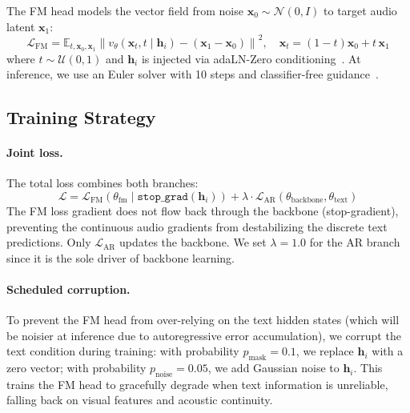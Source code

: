\documentclass{article}
\begin{document}
The FM head models the vector field from noise $\mathbf{x}_0 \sim \mathcal{N}(0, I)$ to target audio latent $\mathbf{x}_1$:
\begin{equation}
    \mathcal{L}_{\text{FM}} = \mathbb{E}_{t, \mathbf{x}_0, \mathbf{x}_1} \left\| v_\theta(\mathbf{x}_t, t \mid \mathbf{h}_i) - (\mathbf{x}_1 - \mathbf{x}_0) \right\|^2, \quad \mathbf{x}_t = (1{-}t)\mathbf{x}_0 + t\,\mathbf{x}_1
\end{equation}
where $t \sim \mathcal{U}(0,1)$ and $\mathbf{h}_i$ is injected via adaLN-Zero conditioning~\cite{dit}. At inference, we use an Euler solver with 10 steps and classifier-free guidance~\cite{cfg}.

\subsection{Training Strategy}

\paragraph{Joint loss.} The total loss combines both branches:
\begin{equation}
    \mathcal{L} = \mathcal{L}_{\text{FM}}(\theta_{\text{fm}} \mid \texttt{stop\_grad}(\mathbf{h}_i)) + \lambda \cdot \mathcal{L}_{\text{AR}}(\theta_{\text{backbone}}, \theta_{\text{text}})
\end{equation}
The FM loss gradient does not flow back through the backbone (stop-gradient), preventing the continuous audio gradients from destabilizing the discrete text predictions. Only $\mathcal{L}_{\text{AR}}$ updates the backbone. We set $\lambda{=}1.0$ for the AR branch since it is the sole driver of backbone learning.

\paragraph{Scheduled corruption.} To prevent the FM head from over-relying on the text hidden states (which will be noisier at inference due to autoregressive error accumulation), we corrupt the text condition during training: with probability $p_{\text{mask}}{=}0.1$, we replace $\mathbf{h}_i$ with a zero vector; with probability $p_{\text{noise}}{=}0.05$, we add Gaussian noise to $\mathbf{h}_i$. This trains the FM head to gracefully degrade when text information is unreliable, falling back on visual features and acoustic continuity.
\end{document}
